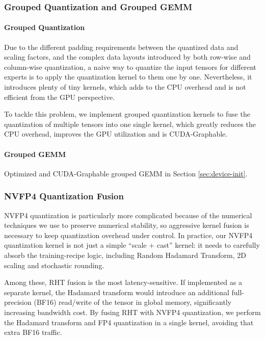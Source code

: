 
\subsubsection{Grouped Quantization and Grouped GEMM}

\paragraph{Grouped Quantization}

Due to the different padding requirements between the quantized data and scaling factors, and the complex data layouts introduced by both row-wise and column-wise quantization, a naive way to quantize the input tensors for different experts is to apply the quantization kernel to them one by one. Nevertheless, it introduces plenty of tiny kernels, which adds to the CPU overhead and is not efficient from the GPU perspective.

To tackle this problem, we implement grouped quantization kernels to fuse the quantization of multiple tensors into one single kernel, which greatly reduces the CPU overhead, improves the GPU utilization and is CUDA-Graphable.

\paragraph{Grouped GEMM}
Optimized and CUDA-Graphable grouped GEMM in Section \ref{sec:device-init}.


\subsubsection{NVFP4 Quantization Fusion}\label{sec:fp4-quant-fusion}

NVFP4 quantization is particularly more complicated because of the numerical techniques we use to preserve numerical stability, so aggressive kernel fusion is necessary to keep quantization overhead under control. In practice, our NVFP4 quantization kernel is not just a simple “scale + cast” kernel: it needs to carefully absorb the training-recipe logic, including Random Hadamard Transform, 2D scaling and stochastic rounding. 

Among these, RHT fusion is the most latency-sensitive. If implemented as a separate kernel, the Hadamard transform would introduce an additional full-precision (BF16) read/write of the tensor in global memory, significantly increasing bandwidth cost. By fusing RHT with NVFP4 quantization, we perform the Hadamard transform and FP4 quantization in a single kernel, avoiding that extra BF16 traffic.

